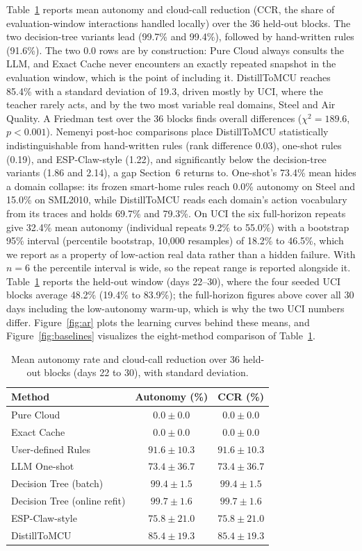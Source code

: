 \documentclass[review]{elsarticle}
\begin{document}
Table~\ref{tab:ar} reports mean autonomy and cloud-call reduction (CCR, the
share of evaluation-window interactions handled locally) over the 36
held-out blocks. The two decision-tree variants lead (99.7\% and 99.4\%),
followed by hand-written rules (91.6\%). The two 0.0 rows are by
construction: Pure Cloud always consults the LLM, and Exact Cache never
encounters an exactly repeated snapshot in the evaluation window, which is
the point of including it. DistillToMCU reaches 85.4\% with a standard
deviation of 19.3, driven mostly by UCI, where the teacher rarely acts, and
by the two most variable real domains, Steel and Air Quality. A Friedman test
over the 36 blocks
finds overall differences ($\chi^2 = 189.6$, $p < 0.001$). Nemenyi post-hoc
comparisons place DistillToMCU statistically indistinguishable from
hand-written rules (rank difference 0.03), one-shot rules (0.19), and
ESP-Claw-style (1.22), and significantly below the decision-tree variants
(1.86 and 2.14), a gap Section~6 returns to. One-shot's 73.4\% mean hides a
domain collapse: its frozen smart-home rules reach 0.0\% autonomy on Steel
and 15.0\% on SML2010, while DistillToMCU reads each domain's action
vocabulary from its traces and holds 69.7\% and 79.3\%. On UCI the six
full-horizon repeats give 32.4\% mean autonomy (individual repeats 9.2\% to
55.0\%) with a bootstrap 95\% interval (percentile bootstrap, 10,000
resamples) of 18.2\% to 46.5\%, which we report as a property of low-action
real data rather than a hidden failure. With $n = 6$ the percentile interval
is wide, so the repeat range is reported alongside it. Table~\ref{tab:ar}
reports the held-out window (days 22--30), where the four seeded UCI blocks
average 48.2\% (19.4\% to 83.9\%); the full-horizon figures above cover all 30
days including the low-autonomy warm-up, which is why the two UCI numbers
differ.
Figure~\ref{fig:ar} plots the learning curves behind these means, and
Figure~\ref{fig:baselines} visualizes the eight-method comparison of
Table~\ref{tab:ar}.

\begin{table}[t]
\centering
\caption{Mean autonomy rate and cloud-call reduction over 36 held-out blocks
(days 22 to 30), with standard deviation.}
\label{tab:ar}
\begin{tabular}{lcc}
\toprule
Method & Autonomy (\%) & CCR (\%) \\
\midrule
Pure Cloud & $0.0 \pm 0.0$ & $0.0 \pm 0.0$ \\
Exact Cache & $0.0 \pm 0.0$ & $0.0 \pm 0.0$ \\
User-defined Rules & $91.6 \pm 10.3$ & $91.6 \pm 10.3$ \\
LLM One-shot & $73.4 \pm 36.7$ & $73.4 \pm 36.7$ \\
Decision Tree (batch) & $99.4 \pm 1.5$ & $99.4 \pm 1.5$ \\
Decision Tree (online refit) & $99.7 \pm 1.6$ & $99.7 \pm 1.6$ \\
ESP-Claw-style & $75.8 \pm 21.0$ & $75.8 \pm 21.0$ \\
DistillToMCU & $85.4 \pm 19.3$ & $85.4 \pm 19.3$ \\
\bottomrule
\end{tabular}
\end{table}
\end{document}
